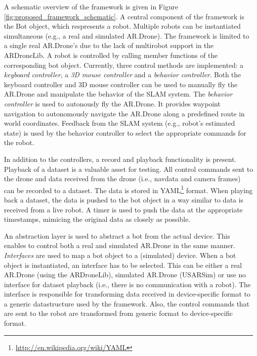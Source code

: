 A schematic overview of the framework is given in Figure \ref{fig:proposed_framework_schematic}.
A central component of the framework is the Bot object, which respresents a robot.
Multiple robots can be instantiated simultaneous (e.g., a real and simulated AR.Drone).
The framework is limited to a single real AR.Drone's due to the lack of multirobot support in the ARDroneLib.
A robot is controlled by calling member functions of the corresponding bot object.
Currently, three control methods are implemented: a \textit{keyboard controller}, a \textit{3D mouse controller} and a \textit{behavior controller}.
Both the keyboard controller and 3D mouse controller can be used to manually fly the AR.Drone and manipulate the behavior of the SLAM system.
The \textit{behavior controller} is used to autonously fly the AR.Drone. 
It provides waypoint navigation to autonomously navigate the AR.Drone along a predefined route in world coordinates.
Feedback from the SLAM system (e.g., robot's estimated state) is used by the behavior controller to select the appropriate commands for the robot.

In addition to the controllers, a record and playback functionality is present.
Playback of a dataset is a valuable asset for testing.
All control commands sent to the drone and data received from the drone (i.e., navdata and camera frames) can be recorded to a dataset.
The data is stored in YAML\footnote{\url{http://en.wikipedia.org/wiki/YAML}} format.
When playing back a dataset, the data is pushed to the bot object in a way similar to data is received from a live robot.
A timer is used to push the data at the appropriate timestamps, mimicing the original data as closely as possible.

An abstraction layer is used to abstract a bot from the actual device.
This enables to control both a real and simulated AR.Drone in the same manner.
\textit{Interfaces} are used to map a bot object to a (simulated) device.
When a bot object is instantiated, an interface has to be selected.
This can be either a real AR.Drone (using the ARDroneLib), simulated AR.Drone (USARSim) or use no interface for dataset playback (i.e., there is no communication with a robot).
The interface is responsible for transforming data received in device-specific format to a generic datastructure used by the framework.
Also, the control commands that are sent to the robot are transformed from generic format to device-specific format.

